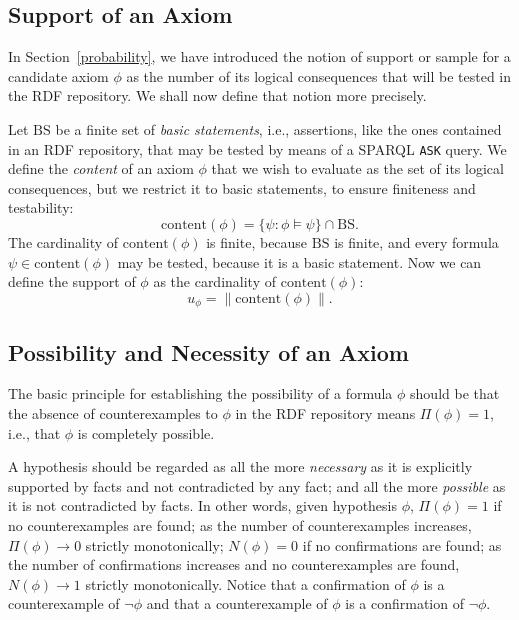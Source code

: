 \documentclass{llncs}
\begin{document}
\subsection{Support of an Axiom}
\label{support}

In Section~\ref{probability}, we have introduced the notion of support or sample
for a candidate axiom $\phi$ as the number of its logical consequences that will be
tested in the RDF repository. We shall now define that notion more precisely.

Let $\mathrm{BS}$ be a finite set of \emph{basic statements}, i.e.,
assertions, like the ones contained in an RDF repository,
that may be tested by means of a SPARQL \texttt{ASK} query.
We define the \emph{content} of an axiom $\phi$ that we wish to evaluate
as the set of its logical consequences, but we restrict it to basic statements, 
to ensure finiteness and testability:
\begin{equation}\label{eq:content}
  \mathrm{content}(\phi) = \{\psi : \phi \models \psi\} \cap \mathrm{BS}.
\end{equation}
The cardinality of $\mathrm{content}(\phi)$ is finite, because $\mathrm{BS}$ is finite,
and every formula $\psi \in \mathrm{content}(\phi)$ may be tested, because it is a basic statement.
Now we can define the support of $\phi$ as the cardinality of $\mathrm{content}(\phi)$:
\begin{equation}\label{eq:content2}
    u_\phi = \|\mathrm{content}(\phi)\|.
\end{equation}


\subsection{Possibility and Necessity of an Axiom}

The basic principle for establishing the possibility of a formula $\phi$ should be
that the absence of counterexamples to $\phi$ in the RDF repository means $\Pi(\phi) = 1$,
i.e., that $\phi$ is completely possible.

A hypothesis should be regarded as all the more
\emph{necessary} as it is explicitly supported by facts and not contradicted by any fact;
and all the more \emph{possible} as it is not contradicted by facts.
In other words, given hypothesis $\phi$, $\Pi(\phi) = 1$ if no counterexamples are found; 
as the number of counterexamples increases, $\Pi(\phi) \to 0$ strictly monotonically;
$N(\phi) = 0$ if no confirmations are found; as the number of confirmations increases
and no counterexamples are found, $N(\phi) \to 1$ strictly monotonically.
Notice that a confirmation of $\phi$ is a counterexample of $\neg\phi$
and that a counterexample of $\phi$ is a confirmation of $\neg\phi$.
\end{document}
